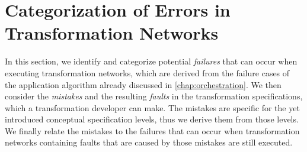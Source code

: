 \section{Categorization of Errors in Transformation Networks}


In this section, we identify and categorize potential \emph{failures} that can occur when executing transformation networks, which are derived from the failure cases of the application algorithm already discussed in \autoref{chap:orchestration}.
We then consider the \emph{mistakes} and the resulting \emph{faults} in the transformation specifications, which a transformation developer can make.
The mistakes are specific for the yet introduced conceptual specification levels, thus we derive them from those levels.
We finally relate the mistakes to the failures that can occur when transformation networks containing faults that are caused by those mistakes are still executed.




